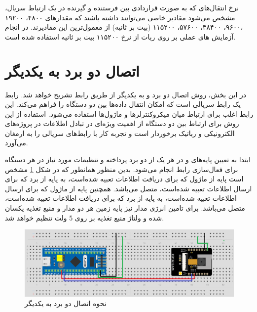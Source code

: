 نرخ انتقال‌های که به صورت قراردادی بین فرستنده و گیرنده در یک ارتباط سریال، مشخص می‌شود مقادیر خاصی می‌توانند داشته باشند که مقدارهای ۴۸۰۰، ۱۹۲۰۰ ،۹۶۰۰، ۳۸۴۰۰، ۵۷۶۰۰، ۱۱۵۲۰۰ (بیت بر ثانیه) از معمول‌ترین این مقادیرند. در انجام آزمایش های عملی بر روی ربات از نرخ ۱۱۵۲۰۰ بیت بر ثانیه استفاده شده است.


\section{اتصال دو برد به یکدیگر}


در این بخش، روش اتصال دو برد  و  به یکدیگر از طریق رابط  تشریح خواهد شد. رابط  یک رابط سریالی است که امکان انتقال داده‌ها بین دو دستگاه را فراهم می‌کند. این رابط اغلب برای ارتباط میان میکروکنترلرها و ماژول‌ها استفاده می‌شود. استفاده از این روش برای ارتباط بین دو دستگاه از اهمیت ویژه‌ای در تبادل اطلاعات در پروژه‌های الکترونیکی و رباتیک برخوردار است و تجربه کار با رابط‌های سریالی را به ارمغان می‌آورد.

ابتدا به تعیین پایه‌های  و  در هر یک از دو برد پرداخته و تنظیمات مورد نیاز در هر دستگاه برای فعال‌سازی رابط  انجام می‌شود. بدین منظور همانطور که در شکل 
\ref{اتصال دو برد}
مشخص است پایه
از ماژول
که برای دریافت اطلاعات تعبیه شده‌است، به پایه
از برد
که برای ارسال اطلاعات تعبیه شده‌است، متصل می‌باشد. همچنین پایه
از ماژول
که برای ارسال اطلاعات تعبیه شده‌است، به پایه
از برد
که برای دریافت اطلاعات تعبیه شده‌است، متصل می‌باشد. برای تامین انرژی مدار نیز پایه زمین هر دو مدار و منبع تغذیه یکسان شده و ولتاژ منبع تغذیه بر روی 5 ولت تنظیم خواهد شد.

\vspace{1cm}
\begin{figure}[h]
	\centering
	\includegraphics[width=1\textwidth]{./images/Chapter3/TwoBoardConnection}	
	\caption{نحوه اتصال دو برد  به یکدیگر}
	\label{اتصال دو برد}
\end{figure}
\newpage
